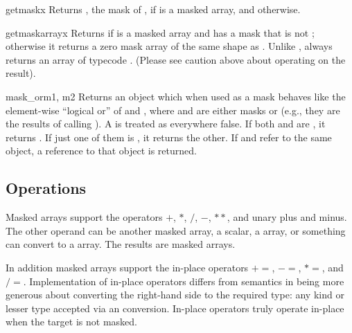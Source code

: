 \begin{funcdesc}{getmask}{x}
   Returns , the mask of
   , if  is a masked array, and  otherwise.
\end{funcdesc}

\begin{funcdesc}{getmaskarray}{x}
   Returns  if  is a masked array and has a mask that is
   not ; otherwise it returns a zero mask array of the same
   shape as .  Unlike ,  always
   returns an \module{\numarray} array of typecode . (Please
   see caution above about operating on the result).
\end{funcdesc}

\begin{funcdesc}{mask_or}{m1, m2}
   Returns an object which when used as a mask behaves like the element-wise
   ``logical or'' of  and , where  and  are
   either masks or  (e.g., they are the results of calling
   ). A  is treated as everywhere false. If both
    and  are , it returns . If
   just one of them is , it returns the other. If  and
    refer to the same object, a reference to that object is returned.
\end{funcdesc}


\subsection{Operations}
\label{sec:numarray.ma:operations}

Masked arrays support the operators $+$, $*$, $/$, $-$, $**$, and unary plus
and minus.  The other operand can be another masked array, a scalar, a
\module{\numarray} array, or something  can convert to a
\module{\numarray} array. The results are masked arrays.

In addition masked arrays support the in-place operators $+=$, $-=$, $*=$, and
$/=$.  Implementation of in-place operators differs from \module{\numarray}
semantics in being more generous about converting the right-hand side to the
required type: any kind or lesser type accepted via an 
conversion.  In-place operators truly operate in-place when the target is not
masked.



